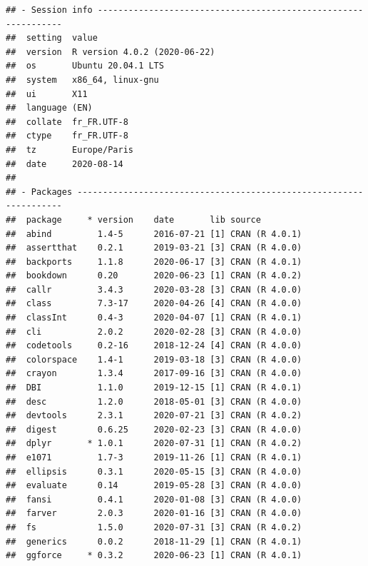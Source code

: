 \documentclass[
  french,
]{book}
\begin{document}
\begin{verbatim}
## - Session info ---------------------------------------------------------------
##  setting  value                       
##  version  R version 4.0.2 (2020-06-22)
##  os       Ubuntu 20.04.1 LTS          
##  system   x86_64, linux-gnu           
##  ui       X11                         
##  language (EN)                        
##  collate  fr_FR.UTF-8                 
##  ctype    fr_FR.UTF-8                 
##  tz       Europe/Paris                
##  date     2020-08-14                  
## 
## - Packages -------------------------------------------------------------------
##  package     * version    date       lib source                            
##  abind         1.4-5      2016-07-21 [1] CRAN (R 4.0.1)                    
##  assertthat    0.2.1      2019-03-21 [3] CRAN (R 4.0.0)                    
##  backports     1.1.8      2020-06-17 [3] CRAN (R 4.0.1)                    
##  bookdown      0.20       2020-06-23 [1] CRAN (R 4.0.2)                    
##  callr         3.4.3      2020-03-28 [3] CRAN (R 4.0.0)                    
##  class         7.3-17     2020-04-26 [4] CRAN (R 4.0.0)                    
##  classInt      0.4-3      2020-04-07 [1] CRAN (R 4.0.1)                    
##  cli           2.0.2      2020-02-28 [3] CRAN (R 4.0.0)                    
##  codetools     0.2-16     2018-12-24 [4] CRAN (R 4.0.0)                    
##  colorspace    1.4-1      2019-03-18 [3] CRAN (R 4.0.0)                    
##  crayon        1.3.4      2017-09-16 [3] CRAN (R 4.0.0)                    
##  DBI           1.1.0      2019-12-15 [1] CRAN (R 4.0.1)                    
##  desc          1.2.0      2018-05-01 [3] CRAN (R 4.0.0)                    
##  devtools      2.3.1      2020-07-21 [3] CRAN (R 4.0.2)                    
##  digest        0.6.25     2020-02-23 [3] CRAN (R 4.0.0)                    
##  dplyr       * 1.0.1      2020-07-31 [1] CRAN (R 4.0.2)                    
##  e1071         1.7-3      2019-11-26 [1] CRAN (R 4.0.1)                    
##  ellipsis      0.3.1      2020-05-15 [3] CRAN (R 4.0.0)                    
##  evaluate      0.14       2019-05-28 [3] CRAN (R 4.0.0)                    
##  fansi         0.4.1      2020-01-08 [3] CRAN (R 4.0.0)                    
##  farver        2.0.3      2020-01-16 [3] CRAN (R 4.0.0)                    
##  fs            1.5.0      2020-07-31 [3] CRAN (R 4.0.2)                    
##  generics      0.0.2      2018-11-29 [1] CRAN (R 4.0.1)                    
##  ggforce     * 0.3.2      2020-06-23 [1] CRAN (R 4.0.1)                    

\end{verbatim}
\end{document}
